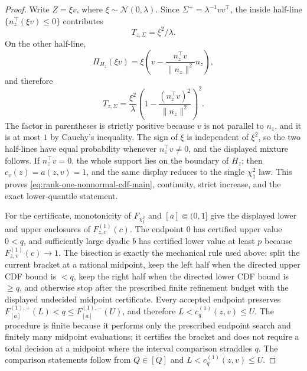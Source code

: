 \begin{proof}
Write \(Z=\xi v\), where \(\xi\sim\mathcal N(0,\lambda)\).  Since
\(\Sigma^+=\lambda^{-1}vv^\top\), the inside half-line
\(\{n_z^\top(\xi v)\le0\}\) contributes
\[
T_{z,\Sigma}=\xi^2/\lambda .
\]
On the other half-line,
\[
\Pi_{H_z}(\xi v)
=\xi\left(v-\frac{n_z^\top v}{\|n_z\|^2}n_z\right),
\]
and therefore
\[
T_{z,\Sigma}
=\frac{\xi^2}{\lambda}
\left(1-\frac{(n_z^\top v)^2}{\|n_z\|^2}\right)^2 .
\]
The factor in parentheses is strictly positive because \(v\) is not parallel
to \(n_z\), and it is at most \(1\) by Cauchy's inequality.  The sign of
\(\xi\) is independent of \(\xi^2\), so the two half-lines have equal
probability whenever \(n_z^\top v\ne0\), and the displayed mixture follows.
If \(n_z^\top v=0\), the whole support lies on the boundary of \(H_z\);
then \(c_v(z)=a(z,v)=1\), and the same display reduces to the single
\(\chi^2_1\) law.  This proves
\eqref{eq:rank-one-nonnormal-cdf-main}, continuity, strict increase, and the
exact lower-quantile statement.

For the certificate, monotonicity of \(F_{\chi^2_1}\) and
\([a]\Subset(0,1]\) give the displayed lower and upper enclosures of
\(F^{(1)}_{z,v}(c)\).  The endpoint \(0\) has certified upper value \(0<q\),
and sufficiently large dyadic \(b\) has certified lower value at least \(p\)
because \(F^{(1)}_{z,v}(c)\to1\).  The bisection is exactly the mechanical
rule used above: split the current bracket at a rational midpoint, keep the
left half when the directed upper CDF bound is \(<q\), keep the right half
when the directed lower CDF bound is \(\ge q\), and otherwise stop after the
prescribed finite refinement budget with the displayed undecided midpoint
certificate.  Every accepted endpoint preserves
\(F^{(1),+}_{[a]}(L)<q\le F^{(1),-}_{[a]}(U)\), and therefore
\(L<c^{(1)}_q(z,v)\le U\).  The procedure is finite because it performs only
the prescribed endpoint search and finitely many midpoint evaluations; it
certifies the bracket and does not require a total decision at a midpoint
where the interval comparison straddles \(q\).  The comparison statements
follow from \(Q\in[Q]\) and \(L<c^{(1)}_q(z,v)\le U\).
\end{proof}


